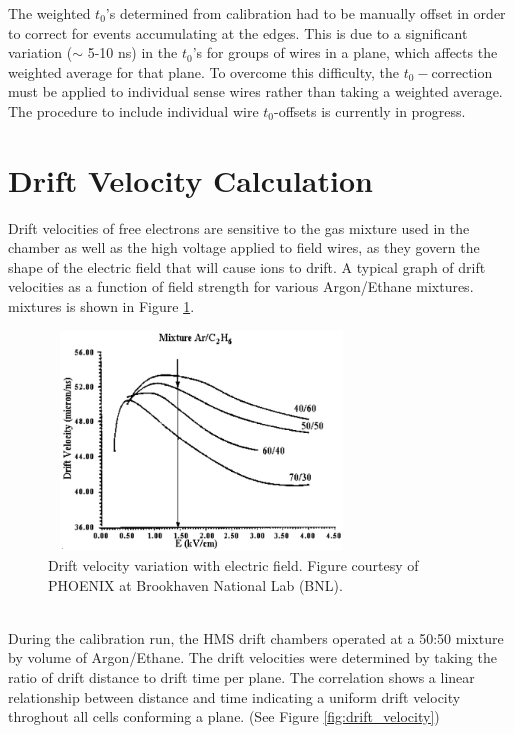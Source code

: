 \documentclass[journal, a4paper]{IEEEtran}
\begin{document}
\indent The weighted $t_{0}$'s determined from calibration had to be manually offset in order to correct
for events accumulating at the edges. This is due to a significant variation ($\sim$ 5-10 ns) in the $t_{0}$'s for groups of wires
in a plane, which affects the weighted average for that plane. To overcome this difficulty, the $t_{0}-$correction
must be applied to individual sense wires rather than taking a weighted average. The procedure to include individual wire
$t_{0}$-offsets is currently in progress.
\section{Drift Velocity Calculation}
Drift velocities of free electrons are sensitive to the gas mixture used in
the chamber as well as the high voltage applied to field wires, as they govern the shape of the electric field that will cause ions to drift. A typical graph
of drift velocities as a function of field strength for various Argon/Ethane mixtures.
mixtures is shown in Figure \ref{fig:drift_vel_vs_Efield}.
\begin{figure}[!ht]
  \centering
  \includegraphics[width=3.2in, height=2.3in]{drift_vel_vs_Efield.png}
  \caption{Drift velocity variation with electric field. Figure courtesy of PHOENIX at Brookhaven National Lab (BNL).}
  \label{fig:drift_vel_vs_Efield}
\end{figure}\\
During the calibration run, the HMS drift chambers operated at a 50:50 mixture by volume of Argon/Ethane. The drift velocities
were determined by taking the ratio of drift distance to drift time per plane. The correlation shows a linear relationship
between distance and time indicating a uniform drift velocity throghout all cells conforming a plane. (See Figure \ref{fig:drift_velocity})
\end{document}

